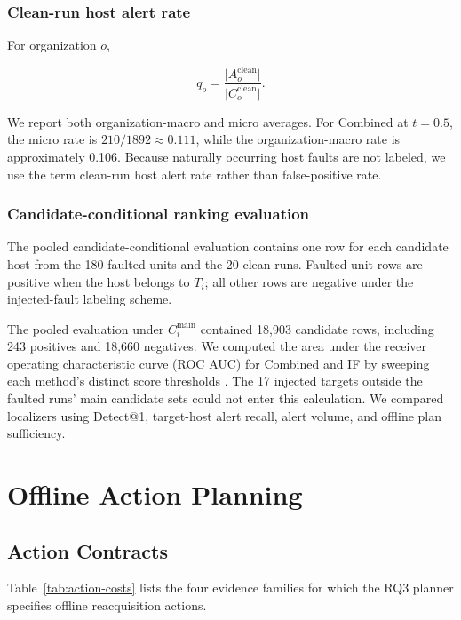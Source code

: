 \documentclass[sn-basic]{sn-jnl}%
\theoremstyle{thmstyleone}%
\theoremstyle{thmstyletwo}%
\theoremstyle{thmstylethree}%
\begin{document}
\subsubsection{Clean-run host alert rate}

For organization \(o\),

\[
q_o=\frac{\lvert A_o^{\mathrm{clean}}\rvert}{\lvert C_o^{\mathrm{clean}}\rvert}.
\]

We report both organization-macro and micro averages. For Combined at \(t=0.5\), the micro rate is \(210/1892\approx0.111\), while the organization-macro rate is approximately 0.106. Because naturally occurring host faults are not labeled, we use the term clean-run host alert rate rather than false-positive rate.

\subsubsection{Candidate-conditional ranking evaluation}

The pooled candidate-conditional evaluation contains one row for each candidate host from the 180 faulted units and the 20 clean runs. Faulted-unit rows are positive when the host belongs to \(T_i\); all other rows are negative under the injected-fault labeling scheme.

The pooled evaluation under \(C_i^{\mathrm{main}}\) contained 18,903 candidate rows, including 243 positives and 18,660 negatives. We computed the area under the receiver operating characteristic curve (ROC AUC) for Combined and IF by sweeping each method's distinct score thresholds \citep{fawcett2006}. The 17 injected targets outside the faulted runs' main candidate sets could not enter this calculation. We compared localizers using Detect@1, target-host alert recall, alert volume, and offline plan sufficiency.

\section{Offline Action Planning}\label{sec:offline-planning}

\subsection{Action Contracts}\label{sec:action-contracts}

Table~\ref{tab:action-costs} lists the four evidence families for which the RQ3 planner specifies offline reacquisition actions.
\end{document}

